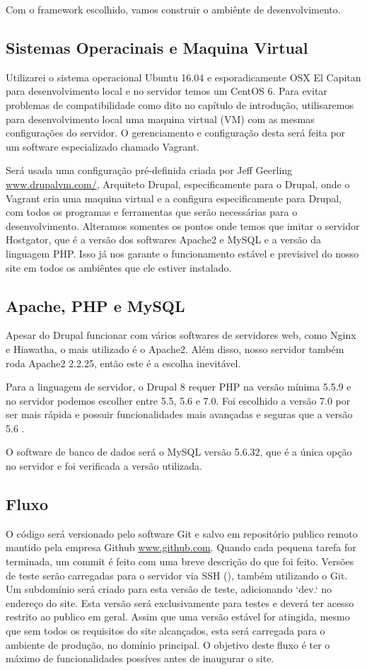 Com o framework escolhido, vamos construir o ambiênte de desenvolvimento. 

\subsection{Sistemas Operacinais e Maquina Virtual} 
Utilizarei o sistema operacional Ubuntu 16.04 e esporadicamente OSX El Capitan para desenvolvimento local e no servidor temos um CentOS 6. Para evitar problemas de compatibilidade como dito no capítulo de introdução, utilisaremos para desenvolvimento local uma maquina virtual (VM) com as mesmas configurações do servidor. O gerenciamento e configuração desta será feita por um software especializado chamado Vagrant.

Será usada uma configuração pré-definida criada por Jeff Geerling \url{www.drupalvm.com/}, Arquiteto Drupal, especificamente para o Drupal, onde o Vagrant cria uma maquina virtual e a configura especificamente para Drupal, com todos os programas e ferramentas que serão necessárias para o desenvolvimento. Alteramos somentes os pontos onde temos que imitar o servidor Hostgator, que é a versão dos softwares Apache2 e MySQL e a versão da linguagem PHP. Isso já nos garante o funcionamento estável e previsivel do nosso site em todos os ambiêntes que ele estiver instalado.

\subsection{Apache, PHP e MySQL}
Apesar do Drupal funcionar com vários softwares de servidores web, como Nginx e Hiawatha, o mais utilizado é o Apache2. Além disso, nosso servidor também roda Apache2 2.2.25, então este é a escolha inevitável. 

Para a linguagem de servidor, o Drupal 8 requer PHP na versão mínima 5.5.9 e no servidor podemos escolher entre 5.5, 5.6 e 7.0. Foi escolhido a versão 7.0 por ser mais rápida \cite{PHP7Velocidade} e possuir funcionalidades mais avançadas e seguras que a versão 5.6 \cite{PHP7}.

O software de banco de dados será o MySQL versão 5.6.32, que é a única opção no servidor e foi verificada a versão utilizada.

\subsection{Fluxo}
O código será versionado pelo software Git e salvo em repositório publico remoto mantido pela empresa Github \url{www.github.com}. Quando cada pequena tarefa for terminada, um commit é feito com uma breve descrição do que foi feito. Versões de teste serão carregadas para o servidor via SSH (\TODO), também utilizando o Git. Um subdomínio será criado para esta versão de teste, adicionando `dev.` no endereço do site. Esta versão será exclusivamente para testes e deverá ter acesso restrito ao publico em geral. Assim que uma versão estável for atingida, mesmo que sem todos os requisitos do site alcançados, esta será carregada para o ambiente de produção, no domínio principal. O objetivo deste fluxo é ter o máximo de funcionalidades possíves antes de inaugurar o site.

